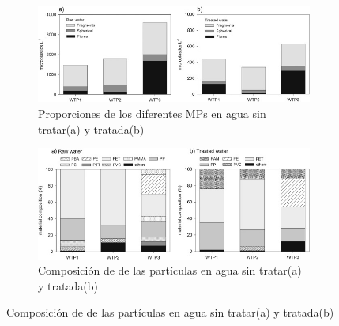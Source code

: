 \documentclass[a4paper,11pt]{article}
\begin{document}
	\begin{figure}[H]
		\centering
		\begin{subfigure}{0.45\textwidth}
			\includegraphics[width=1\textwidth]{proporcion.jpg}
			\caption{Proporciones de los diferentes MPs en agua sin tratar(a) y tratada(b)}
		\end{subfigure}
		\begin{subfigure}{0.45\textwidth}
			\includegraphics[width=1\textwidth]{composicion.jpg}
			\caption{Composición de de las partículas en agua sin tratar(a) y tratada(b)}
		\end{subfigure}
		
	\end{figure}
\end{document}
